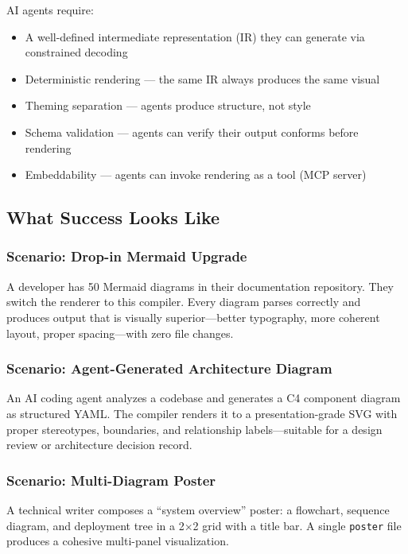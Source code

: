 AI agents require:
\begin{itemize}
  \item A well-defined intermediate representation (IR) they can generate via constrained decoding
  \item Deterministic rendering --- the same IR always produces the same visual
  \item Theming separation --- agents produce structure, not style
  \item Schema validation --- agents can verify their output conforms before rendering
  \item Embeddability --- agents can invoke rendering as a tool (MCP server)
\end{itemize}

\subsection{What Success Looks Like}

\subsubsection{Scenario: Drop-in Mermaid Upgrade}

A developer has 50 Mermaid diagrams in their documentation repository. They switch the renderer to this compiler. Every diagram parses correctly and produces output that is visually superior---better typography, more coherent layout, proper spacing---with zero file changes.

\subsubsection{Scenario: Agent-Generated Architecture Diagram}

An AI coding agent analyzes a codebase and generates a C4 component diagram as structured YAML. The compiler renders it to a presentation-grade SVG with proper stereotypes, boundaries, and relationship labels---suitable for a design review or architecture decision record.

\subsubsection{Scenario: Multi-Diagram Poster}

A technical writer composes a ``system overview'' poster: a flowchart, sequence diagram, and deployment tree in a 2$\times$2 grid with a title bar. A single \texttt{poster} file produces a cohesive multi-panel visualization.

